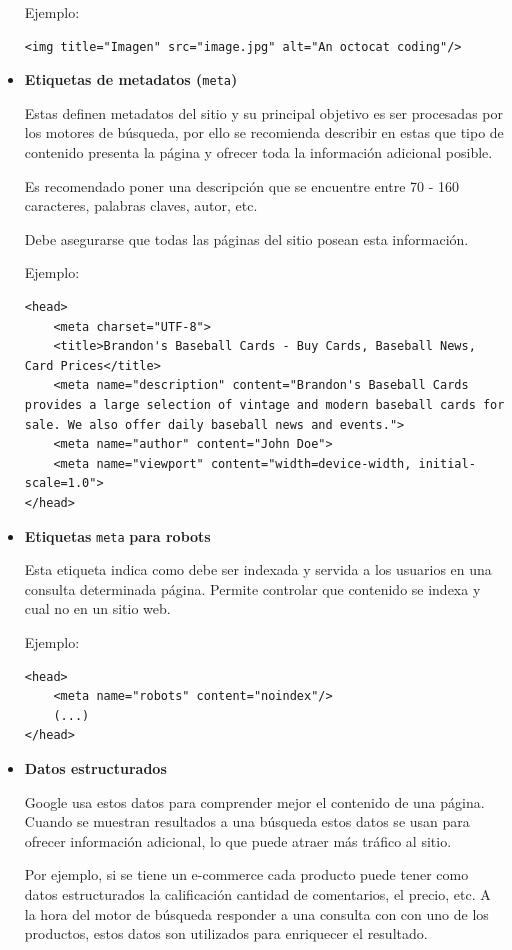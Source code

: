 \documentclass[12pt]{llncs}
\begin{document}
\begin{itemize}
Ejemplo:
\begin{lstlisting}
<img title="Imagen" src="image.jpg" alt="An octocat coding"/>    
\end{lstlisting}

\item \textbf{Etiquetas de metadatos (}\verb+meta+\textbf{)}

Estas definen metadatos del sitio y su principal objetivo es ser procesadas por los motores de búsqueda, por ello se recomienda describir en estas que tipo de contenido presenta la página y ofrecer toda la información adicional posible.

Es recomendado poner una descripción que se encuentre entre 70 - 160 caracteres, palabras claves, autor, etc.

Debe asegurarse que todas las páginas del sitio posean esta información.

Ejemplo:
\begin{lstlisting}
<head>
    <meta charset="UTF-8">
    <title>Brandon's Baseball Cards - Buy Cards, Baseball News, Card Prices</title>
    <meta name="description" content="Brandon's Baseball Cards provides a large selection of vintage and modern baseball cards for sale. We also offer daily baseball news and events.">
    <meta name="author" content="John Doe">
    <meta name="viewport" content="width=device-width, initial-scale=1.0">
</head>
\end{lstlisting}

\item \textbf{Etiquetas} \verb+meta+  \textbf{para robots} \cite{meta_robots}

Esta etiqueta indica como debe ser indexada y servida a los usuarios en una consulta determinada página. Permite controlar que contenido se indexa y cual no en un sitio web.

Ejemplo:
\begin{lstlisting}
<head>
    <meta name="robots" content="noindex"/>
    (...)
</head>
\end{lstlisting}

\item \textbf{Datos estructurados} \cite{rich_results}

Google usa estos datos para comprender mejor el contenido de una página. Cuando se muestran resultados a una búsqueda estos datos se usan para ofrecer información adicional, lo que puede atraer más tráfico al sitio.

Por ejemplo, si se tiene un e-commerce cada producto puede tener como datos estructurados la calificación cantidad de comentarios, el precio, etc. A la hora del motor de búsqueda responder a una consulta con con uno de los productos, estos datos son utilizados para enriquecer el resultado.


\end{itemize}
\end{document}
